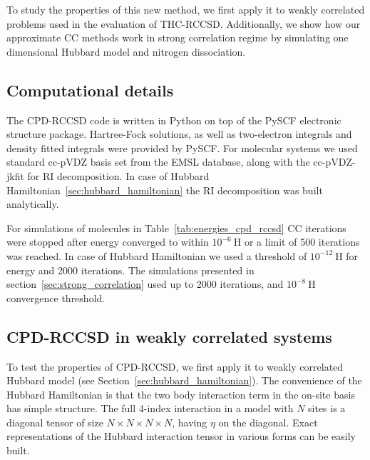 To study the properties of this new method, we first apply it to weakly 
correlated problems used in the evaluation of 
THC-RCCSD.\cite{schutski2017tensor} Additionally, we show how our 
approximate CC methods work in strong correlation regime by simulating 
one dimensional Hubbard model\cite{essler2005one} and nitrogen 
dissociation.

\subsection{Computational details}
The CPD-RCCSD code is written in Python\cite{van2007python} on top of the 
PySCF\cite{sun2017python} electronic structure package. Hartree-Fock solutions, 
as well as two-electron integrals and density fitted integrals were 
provided by PySCF. For molecular systems we used standard cc-pVDZ basis set from 
the EMSL database,\cite{schuchardt2007basis} along with the cc-pVDZ-jkfit for 
RI decomposition. In case of Hubbard Hamiltonian~\ref{sec:hubbard_hamiltonian} 
the RI decomposition was built analytically.

For simulations of molecules in Table~\ref{tab:energies_cpd_rccsd} CC iterations 
were stopped after energy converged to within $10^{-6}~\mathrm{H}$ or a limit 
of 500 iterations was reached. In case of Hubbard Hamiltonian we used a 
threshold of $10^{-12}~\mathrm{H}$ for energy and 2000 iterations. The 
simulations presented in section~\ref{sec:strong_correlation} used up to 2000 
iterations, and $10^{-8}~\mathrm{H}$ convergence threshold. 

\subsection{CPD-RCCSD in weakly correlated systems}
To test the properties of CPD-RCCSD, we first apply it to weakly correlated 
Hubbard model (see Section~\ref{sec:hubbard_hamiltonian}). The convenience of 
the Hubbard Hamiltonian is that the two body interaction term in the on-site 
basis has simple structure. The full 4-index interaction in a model with $N$ 
sites is a diagonal tensor of size $N\times N\times N \times N$, having $\eta$ 
on the diagonal. Exact representations of the Hubbard interaction tensor in 
various forms can be easily built.

